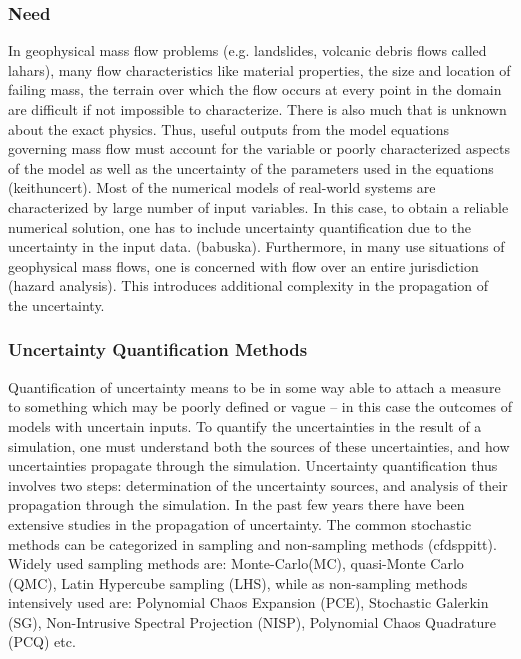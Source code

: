 \documentclass{article}
\begin{document}
\subsubsection{Need} In geophysical mass flow problems (e.g. landslides, volcanic debris flows called lahars), many flow characteristics like
material properties, the size and location of failing mass, the terrain over which the 
flow occurs at every point in the domain are difficult if not impossible to characterize. There is also much that is unknown about the
exact physics. Thus, useful outputs from the model equations governing mass flow must account for 
the variable or poorly characterized aspects of the model as well as the uncertainty of the 
parameters used in the equations (keithuncert). 
Most of the numerical models of real-world systems are characterized by large number of input
variables. In this case, to obtain a reliable numerical 
solution, one has to include uncertainty quantification due to the uncertainty in the input data. (babuska). Furthermore, 
in many use situations of geophysical mass flows, one is concerned with flow over an entire jurisdiction (hazard analysis). 
This introduces additional complexity in the propagation of the uncertainty.

\subsubsection{Uncertainty Quantification Methods} Quantification of uncertainty means to be in some way able to attach a measure
to something which may be poorly defined or vague \citep{Matthies2008} -- in this case the outcomes of models 
with uncertain inputs. 
To quantify the uncertainties in the result of a simulation, one must understand 
both the sources of these uncertainties, and how uncertainties propagate through the simulation. 
Uncertainty quantification thus involves two steps: determination of the uncertainty sources, and 
analysis of their propagation through the simulation. In the past few years there have been 
extensive studies in the propagation of uncertainty. The common stochastic methods can be
categorized in sampling and non-sampling methods (cfdsppitt). Widely used sampling methods
are: Monte-Carlo(MC), quasi-Monte Carlo (QMC), Latin Hypercube sampling (LHS), while as 
non-sampling methods intensively used are:  Polynomial Chaos Expansion (PCE), Stochastic Galerkin (SG),
Non-Intrusive Spectral Projection (NISP), Polynomial Chaos Quadrature (PCQ) etc. 
\end{document}
